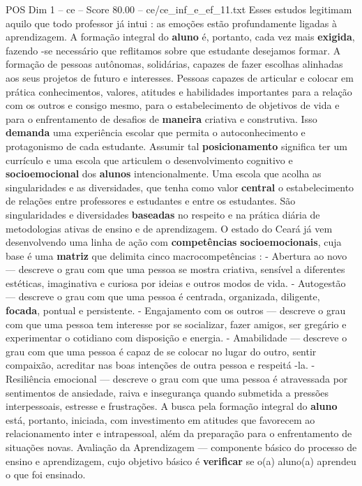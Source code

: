 \begin{textsample}{POS Dim 1 – ce – Score 80.00 – ce/ce\_inf\_e\_ef\_11.txt}
Esses estudos legitimam aquilo que todo professor já intui : as emoções estão profundamente ligadas à aprendizagem.
A formação integral do \textbf{aluno} é, portanto, cada vez mais \textbf{exigida}, fazendo -se necessário que reflitamos sobre que estudante desejamos formar.
A formação de pessoas autônomas, solidárias, capazes de fazer escolhas alinhadas aos seus projetos de futuro e interesses.
Pessoas capazes de articular e colocar em prática conhecimentos, valores, atitudes e habilidades importantes para a relação com os outros e consigo mesmo, para o estabelecimento de objetivos de vida e para o enfrentamento de desafios de \textbf{maneira} criativa e construtiva.
Isso \textbf{demanda} uma experiência escolar que permita o autoconhecimento e protagonismo de cada estudante.
Assumir tal \textbf{posicionamento} significa ter um currículo e uma escola que articulem o desenvolvimento cognitivo e \textbf{socioemocional} dos \textbf{alunos} intencionalmente.
Uma escola que acolha as singularidades e as diversidades, que tenha como valor \textbf{central} o estabelecimento de relações entre professores e estudantes e entre os estudantes.
São singularidades e diversidades \textbf{baseadas} no respeito e na prática diária de metodologias ativas de ensino e de aprendizagem.
O estado do Ceará já vem desenvolvendo uma linha de ação com \textbf{competências} \textbf{socioemocionais}, cuja base é uma \textbf{matriz} que delimita cinco macrocompetências : - Abertura ao novo — descreve o grau com que uma pessoa se mostra criativa, sensível a diferentes estéticas, imaginativa e curiosa por ideias e outros modos de vida. - Autogestão — descreve o grau com que uma pessoa é centrada, organizada, diligente, \textbf{focada}, pontual e persistente. - Engajamento com os outros — descreve o grau com que uma pessoa tem interesse por se socializar, fazer amigos, ser gregário e experimentar o cotidiano com disposição e energia. - Amabilidade — descreve o grau com que uma pessoa é capaz de se colocar no lugar do outro, sentir compaixão, acreditar nas boas intenções de outra pessoa e respeitá -la. - Resiliência emocional — descreve o grau com que uma pessoa é atravessada por sentimentos de ansiedade, raiva e insegurança quando submetida a pressões interpessoais, estresse e frustrações.
A busca pela formação integral do \textbf{aluno} está, portanto, iniciada, com investimento em atitudes que favorecem ao relacionamento inter e intrapessoal, além da preparação para o enfrentamento de situações novas.
Avaliação da Aprendizagem — componente básico do processo de ensino e aprendizagem, cujo objetivo básico é \textbf{verificar} se o(a) aluno(a) aprendeu o que foi ensinado.

\end{textsample}
